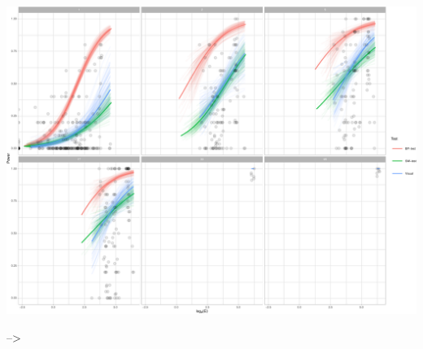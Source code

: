 \documentclass[]{interact}
\theoremstyle{plain}%
\theoremstyle{definition}
\theoremstyle{remark}
\begin{document}
\includegraphics[width=1\linewidth]{paper_comparison_files/figure-latex/unnamed-chunk-20-1}

--\textgreater{}



\end{document}
